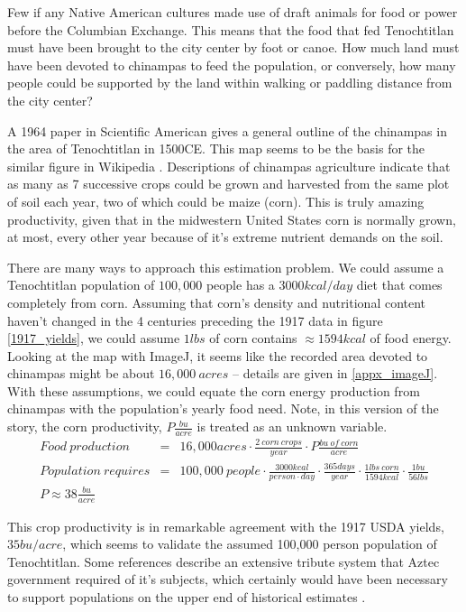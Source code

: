 \documentclass[12pt]{iopart}
\newcommand{\bea}{\begin{eqnarray}}
\newcommand{\eea}{\end{eqnarray}}
\begin{document}
Few if any Native American cultures made use of draft animals for food or power before the Columbian Exchange.  This means that the food that fed Tenochtitlan must have been brought to the city center by foot or canoe.  How much land must have been devoted to chinampas to feed the population, or conversely, how many people could be supported by the land within walking or paddling distance from the city center?

A 1964 paper in Scientific American \cite{Chinampas_1964} gives a general outline of the chinampas in the area of Tenochtitlan in 1500CE.  This map seems to be the basis for the similar figure in Wikipedia \cite{chinampas_wikipedia}.  Descriptions of chinampas agriculture indicate that as many as 7 successive crops could be grown and harvested from the same plot of soil each year, two of which could be maize (corn).  This is truly amazing productivity, given that in the midwestern United States corn is normally grown, at most, every other year because of it's extreme nutrient demands on the soil.

There are many ways to approach this estimation problem.  We could assume a Tenochtitlan population of $100,000$ people has a $3000kcal/day$ diet that comes completely from corn.  Assuming that corn's density and nutritional content haven't changed in the 4 centuries preceding the 1917 data in figure \ref{1917_yields}, we could assume $1lbs$ of corn contains $\approx1594kcal$ of food energy.  
Looking at the map with ImageJ, it seems like the recorded area devoted to chinampas might be about
$16,000~acres$ -- details are given in \ref{appx_imageJ}.
With these assumptions, we could equate the corn energy production from chinampas with the population's yearly food need. Note, in this version of the story, the corn productivity, $P\frac{bu}{acre}$ is treated as an unknown variable.  
\bea
Food~production &=& 16,000acres\cdot \frac{2~corn~crops}{year}\cdot P \frac{bu~of~corn}{acre} \nonumber \\
Population~requires &=& 100,000~people\cdot \frac{3000kcal}{person\cdot day}\cdot\frac{365days}{year}\cdot\frac{1lbs~corn}{1594kcal}\cdot\frac{1bu}{56lbs} \nonumber \\
P \approx 38\frac{bu}{acre} && 
\eea

This crop productivity is in remarkable agreement with the 1917 USDA yields, $35bu/acre$, which seems to validate the assumed 100,000 person population of Tenochtitlan.  Some references \cite{Chinampas_1964} describe an extensive tribute system that Aztec government required of it's subjects, which certainly would have been necessary to support populations on the upper end of historical estimates \cite{400k}.
\end{document}

